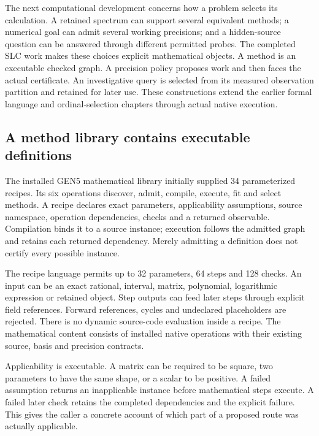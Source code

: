 \label{v3-runtime-methods}

The next computational development concerns how a problem selects its calculation. A retained spectrum can support several equivalent methods; a numerical goal can admit several working precisions; and a hidden-source question can be answered through different permitted probes. The completed SLC work makes these choices explicit mathematical objects. A method is an executable checked graph. A precision policy proposes work and then faces the actual certificate. An investigative query is selected from its measured observation partition and retained for later use. These constructions extend the earlier formal language and ordinal-selection chapters through actual native execution.

\subsection{A method library contains executable definitions}
\label{v3-runtime-recipe}

The installed GEN5 mathematical library initially supplied 34 parameterized recipes. Its six operations discover, admit, compile, execute, fit and select methods. A recipe declares exact parameters, applicability assumptions, source namespace, operation dependencies, checks and a returned observable. Compilation binds it to a source instance; execution follows the admitted graph and retains each returned dependency. Merely admitting a definition does not certify every possible instance.

The recipe language permits up to 32 parameters, 64 steps and 128 checks. An input can be an exact rational, interval, matrix, polynomial, logarithmic expression or retained object. Step outputs can feed later steps through explicit field references. Forward references, cycles and undeclared placeholders are rejected. There is no dynamic source-code evaluation inside a recipe. The mathematical content consists of installed native operations with their existing source, basis and precision contracts.

Applicability is executable. A matrix can be required to be square, two parameters to have the same shape, or a scalar to be positive. A failed assumption returns an inapplicable instance before mathematical steps execute. A failed later check retains the completed dependencies and the explicit failure. This gives the caller a concrete account of which part of a proposed route was actually applicable.


